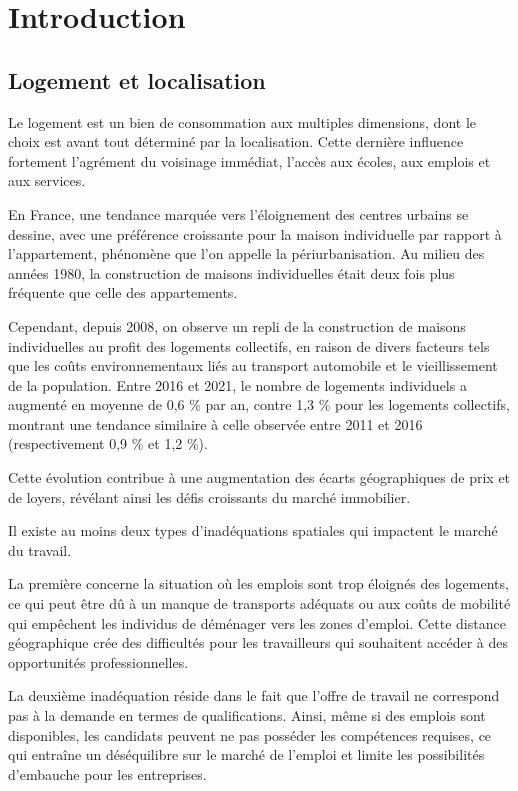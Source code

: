 \documentclass[a4paper, 12pt]{report}
\begin{document}
	\chapter*{Introduction}
	
\section{Logement et localisation}

Le logement est un bien de consommation aux multiples dimensions, dont le choix est avant tout déterminé par la localisation. Cette dernière influence fortement l'agrément du voisinage immédiat, l'accès aux écoles, aux emplois et aux services.

En France, une tendance marquée vers l’éloignement des centres urbains se dessine, avec une préférence croissante pour la maison individuelle par rapport à l’appartement, phénomène que l'on appelle la périurbanisation. Au milieu des années 1980, la construction de maisons individuelles était deux fois plus fréquente que celle des appartements.

Cependant, depuis 2008, on observe un repli de la construction de maisons individuelles au profit des logements collectifs, en raison de divers facteurs tels que les coûts environnementaux liés au transport automobile et le vieillissement de la population. Entre 2016 et 2021, le nombre de logements individuels a augmenté en moyenne de 0,6 \% par an, contre 1,3 \% pour les logements collectifs, montrant une tendance similaire à celle observée entre 2011 et 2016 (respectivement 0,9 \% et 1,2 \%).

Cette évolution contribue à une augmentation des écarts géographiques de prix et de loyers, révélant ainsi les défis croissants du marché immobilier.

Il existe au moins deux types d’inadéquations spatiales qui impactent le marché du travail.

La première concerne la situation où les emplois sont trop éloignés des logements, ce qui peut être dû à un manque de transports adéquats ou aux coûts de mobilité qui empêchent les individus de déménager vers les zones d'emploi. Cette distance géographique crée des difficultés pour les travailleurs qui souhaitent accéder à des opportunités professionnelles. 

La deuxième inadéquation réside dans le fait que l’offre de travail ne correspond pas à la demande en termes de qualifications. Ainsi, même si des emplois sont disponibles, les candidats peuvent ne pas posséder les compétences requises, ce qui entraîne un déséquilibre sur le marché de l'emploi et limite les possibilités d'embauche pour les entreprises. 
\end{document}

